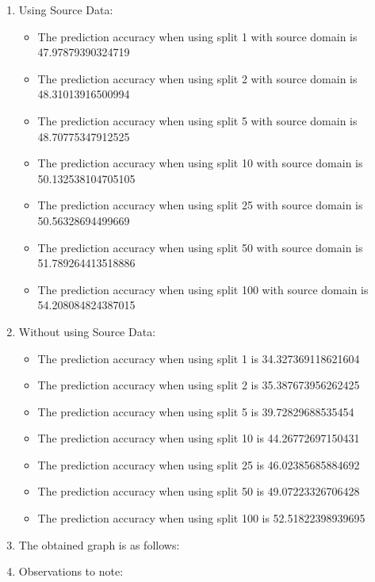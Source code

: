 \documentclass[12pt]{article}
\begin{document}
\begin{enumerate}[label=(\alph*)]
\begin{enumerate}[label=\roman*.]
    \item Using Source Data:
    \begin{itemize}
        \item The prediction accuracy when using split 1 with source domain is 47.97879390324719
        \item The prediction accuracy when using split 2 with source domain is 48.31013916500994
        \item The prediction accuracy when using split 5 with source domain is 48.70775347912525
        \item The prediction accuracy when using split 10 with source domain is 50.132538104705105
        \item The prediction accuracy when using split 25 with source domain is 50.56328694499669
        \item The prediction accuracy when using split 50 with source domain is 51.789264413518886
        \item The prediction accuracy when using split 100 with source domain is 54.208084824387015
    \end{itemize}
    \item Without using Source Data:
    \begin{itemize}
        \item The prediction accuracy when using split 1 is 34.327369118621604
        \item The prediction accuracy when using split 2 is 35.387673956262425
        \item The prediction accuracy when using split 5 is 39.72829688535454
        \item The prediction accuracy when using split 10 is 44.26772697150431
        \item The prediction accuracy when using split 25 is 46.02385685884692
        \item The prediction accuracy when using split 50 is 49.07223326706428
        \item The prediction accuracy when using split 100 is 52.51822398939695
    \end{itemize}
    \item The obtained graph is as follows:
     \begin{center}\end{center}
    \newpage
    \item Observations to note:

\end{enumerate}
\end{enumerate}
\end{document}
